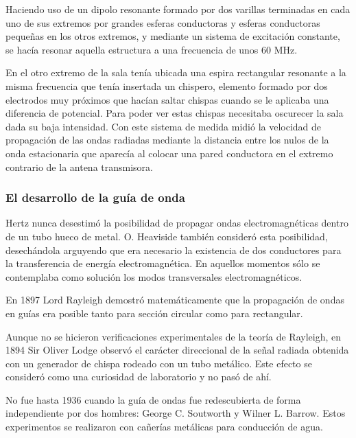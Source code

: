 \documentclass[12pt]{article}
\begin{document}
Haciendo uso de un dipolo resonante formado por dos varillas terminadas en cada uno de sus extremos por grandes esferas conductoras y esferas conductoras peque\~nas en los otros extremos, y mediante un sistema de excitaci\'on constante, se hac\'ia resonar aquella estructura a una frecuencia de unos 60 MHz.
\vspace{0.4cm}
	
En el otro extremo de la sala ten\'ia ubicada una espira rectangular resonante a la misma frecuencia que ten\'ia insertada un chispero, elemento formado por dos electrodos muy pr\'oximos que hac\'ian saltar chispas cuando se le aplicaba una diferencia de potencial. Para poder ver estas chispas necesitaba oscurecer la sala dada su baja intensidad. Con este sistema de medida midi\'o la velocidad de propagaci\'on de las ondas radiadas mediante la distancia entre los nulos de la onda estacionaria que aparec\'ia al colocar una pared conductora en el extremo contrario de la antena transmisora.
	
\subsubsection{El desarrollo de la gu\'ia de onda}
Hertz nunca desestim\'o la posibilidad de propagar ondas electromagn\'eticas dentro de un tubo hueco de metal. O. Heaviside tambi\'en consider\'o esta posibilidad, desech\'andola arguyendo que era necesario la existencia de dos conductores para la transferencia de energ\'ia electromagn\'etica. En aquellos momentos s\'olo se contemplaba como soluci\'on los modos transversales electromagn\'eticos.
\vspace{0.4cm}
	
En 1897 Lord Rayleigh demostr\'o matem\'aticamente que la propagaci\'on de ondas en gu\'ias era posible tanto para secci\'on circular como para rectangular.
\vspace{0.4cm}

Aunque no se hicieron verificaciones experimentales de la teor\'ia de Rayleigh, en 1894 Sir Oliver Lodge observ\'o el car\'acter direccional de la se\~nal radiada obtenida con un generador de chispa rodeado con un tubo met\'alico. Este efecto se consider\'o como una curiosidad de laboratorio y no pas\'o de ah\'i.
\vspace{0.4cm}

No fue hasta 1936 cuando la gu\'ia de ondas fue redescubierta de forma independiente por dos hombres: George C. Soutworth y Wilner L. Barrow. Estos experimentos se realizaron con ca\~ner\'ias met\'alicas para conducci\'on de agua.
\end{document}
